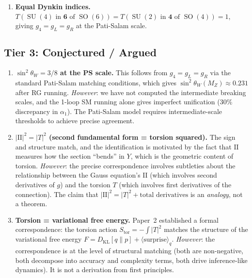 \documentclass[12pt,a4paper]{article}
\DeclareMathOperator{\SO}{SO}
\DeclareMathOperator{\SU}{SU}
\begin{document}
\begin{computedbox}
\begin{enumerate}
\item \textbf{Equal Dynkin indices.} $T(\SU(4) \text{ in } \mathbf{6} \text{ of } \SO(6)) = T(\SU(2) \text{ in } \mathbf{4} \text{ of } \SO(4)) = 1$, giving $g_4 = g_L = g_R$ at the Pati-Salam scale.
\end{enumerate}
\end{computedbox}

\subsection{Tier 3: Conjectured / Argued}

\begin{conjecturebox}

\begin{enumerate}
\item \textbf{$\sin^2\theta_W = 3/8$ at the PS scale.} This follows from $g_4 = g_L = g_R$ via the standard Pati-Salam matching conditions, which gives $\sin^2\theta_W(M_Z) \approx 0.231$ after RG running. \textit{However}: we have not computed the intermediate breaking scales, and the 1-loop SM running alone gives imperfect unification (30\% discrepancy in $\alpha_1$). The Pati-Salam model requires intermediate-scale thresholds to achieve precise agreement.

\item \textbf{$|\mathrm{II}|^2 = |T|^2$ (second fundamental form = torsion squared).} The sign and structure match, and the identification is motivated by the fact that $\mathrm{II}$ measures how the section ``bends'' in $Y$, which is the geometric content of torsion. \textit{However}: the precise correspondence involves subtleties about the relationship between the Gauss equation's $\mathrm{II}$ (which involves second derivatives of $g$) and the torsion $T$ (which involves first derivatives of the connection). The claim that $|\mathrm{II}|^2 = |T|^2 + \text{total derivatives}$ is an \textit{analogy}, not a theorem.

\item \textbf{Torsion = variational free energy.} Paper~2 established a formal correspondence: the torsion action $S_{\text{tor}} = -\int|T|^2$ matches the structure of the variational free energy $F = D_{\text{KL}}[q\|p] + \langle \text{surprise}\rangle_q$. \textit{However}: the correspondence is at the level of structural matching (both are non-negative, both decompose into accuracy and complexity terms, both drive inference-like dynamics). It is not a derivation from first principles.


\end{enumerate}
\end{conjecturebox}
\end{document}
